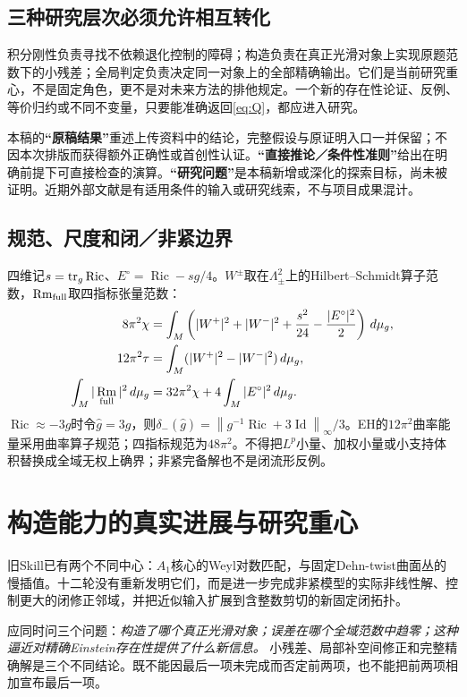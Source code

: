\documentclass[UTF8,fontset=fandol,zihao=-4]{ctexart}
\DeclareMathOperator{\Ric}{Ric}\DeclareMathOperator{\Rm}{Rm}
\DeclareMathOperator{\Id}{Id}\DeclareMathOperator{\Hess}{Hess}
\newcommand{\dd}{\,d\mu_g}\newcommand{\op}{\mathrm{op}}
\newcommand{\norm}[1]{\left\|#1\right\|}
\theoremstyle{cn}
\begin{document}
\subsection{三种研究层次必须允许相互转化}
积分刚性负责寻找不依赖退化控制的障碍；构造负责在真正光滑对象上实现原题范数下的小残差；全局判定负责决定同一对象上的全部精确输出。它们是当前研究重心，不是固定角色，更不是对未来方法的排他规定。一个新的存在性论证、反例、等价归约或不同不变量，只要能准确返回\eqref{eq:Q}，都应进入研究。

本稿的\textbf{“原稿结果”}重述上传资料中的结论，完整假设与原证明入口一并保留；不因本次排版而获得额外正确性或首创性认证。\textbf{“直接推论／条件性准则”}给出在明确前提下可直接检查的演算。\textbf{“研究问题”}是本稿新增或深化的探索目标，尚未被证明。近期外部文献是有适用条件的输入或研究线索，不与项目成果混计。

\subsection{规范、尺度和闭／非紧边界}
四维记$s=\tr_g\Ric$、$E^\circ=\Ric-sg/4$。$W^\pm$取在$\Lambda^2_\pm$上的Hilbert--Schmidt算子范数，$\Rm_{\rm full}$取四指标张量范数：
\begin{align}
8\pi^2\chi&=\int_M\left(|W^+|^2+|W^-|^2+\frac{s^2}{24}-\frac{|E^\circ|^2}{2}\right)\dd,\label{eq:CGB}\\
12\pi^2\tau&=\int_M(|W^+|^2-|W^-|^2)\dd,\\
\int_M|\Rm_{\rm full}|^2\dd&=32\pi^2\chi+4\int_M|E^\circ|^2\dd.\label{eq:fullenergy}
\end{align}
$\Ric\approx-3g$时令$\widehat g=3g$，则$\delta_-(\widehat g)=\norm{g^{-1}\Ric+3\Id}_\infty/3$。EH的$12\pi^2$曲率能量采用曲率算子规范；四指标规范为$48\pi^2$。不得把$L^p$小量、加权小量或小支持体积替换成全域无权上确界；非紧完备解也不是闭流形反例。

\section{构造能力的真实进展与研究重心}
旧Skill已有两个不同中心：$A_1$核心的Weyl对数匹配，与固定Dehn-twist曲面丛的慢插值。十二轮没有重新发明它们，而是进一步完成非紧模型的实际非线性解、控制更大的闭修正邻域，并把近似输入扩展到含整数剪切的新固定闭拓扑。

应同时问三个问题：\emph{构造了哪个真正光滑对象；误差在哪个全域范数中趋零；这种逼近对精确Einstein存在性提供了什么新信息。} 小残差、局部补空间修正和完整精确解是三个不同结论。既不能因最后一项未完成而否定前两项，也不能把前两项相加宣布最后一项。
\end{document}
